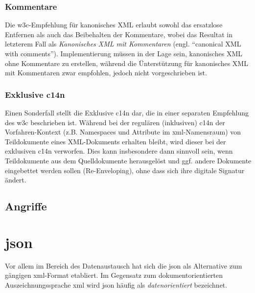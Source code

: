 \subsubsection{Kommentare}
\label{sec:c14ncomments}

Die \gls{w3c}-Empfehlung für kanonisches XML erlaubt sowohl das ersatzlose Entfernen als auch das Beibehalten der Kommentare, wobei das Resultat in letzterem Fall als \emph{Kanonisches XML mit Kommentaren} (engl. \enquote{canonical XML with comments})\cite[Abschnitt 2.1]{boyer2001c14n}. Implementierung müssen in der Lage sein, kanonisches XML ohne Kommentare zu erstellen, während die Ünterstützung für kanonisches XML mit Kommentaren zwar empfohlen, jedoch nicht vorgeschrieben ist.

\subsubsection{Exklusive \acrlong{c14n}}
\label{sec:excc14n}

Einen Sonderfall stellt die Exklusive \acrlong{c14n} dar, die in einer separaten Empfehlung des \gls{w3c} beschrieben ist.\cite{boyer2002excc14n} Während bei der regulären (inklusiven) \acrlong{c14n} der Vorfahren-Kontext (z.B. Namespaces und Attribute im \acrshort{xml}-Namensraum) von Teildokumente eines XML-Dokuments erhalten bleibt, wird dieser bei der exklusiven \acrshort{c14n} verworfen.\cite[Abschnitt~18]{siddiqui2002c14n2} Dies kann insbesondere dann sinnvoll sein, wenn Teildokumente aus dem Quelldokumente herausgelöst und ggf. andere Dokumente eingebettet werden sollen (Re-Enveloping), ohne dass sich ihre digitale Signatur ändert.

\subsection{Angriffe}
\label{sec:xmlattacks}


\section{\acrfull{json}}
\label{sec:json}

Vor allem im Bereich des Datenaustausch hat sich die \acrfull{json} als Alternative zum gängigen \acrshort{xml}-Format etabliert. Im Gegensatz zum dokumentorientierten Auszeichnungssprache \acrshort{xml} wird \acrshort{json} häufig als \emph{datenorientiert} bezeichnet.\cite{gupta2007xmljson}

